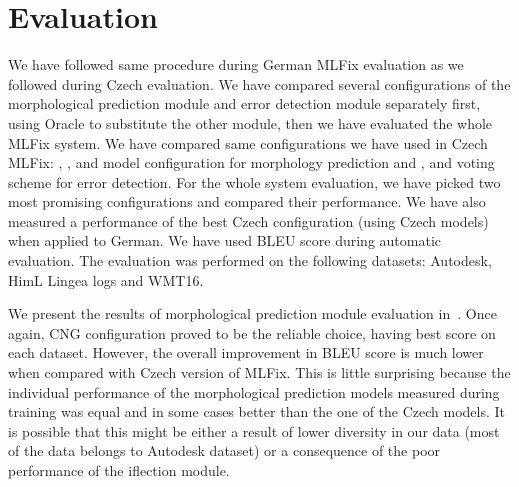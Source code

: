 \section{Evaluation}

We have followed same procedure during German MLFix evaluation as we followed during
Czech evaluation. We have compared several configurations of the morphological prediction
module and error detection module separately first, using Oracle to substitute the other
module, then we have evaluated the whole MLFix system. We have compared same configurations
we have used in Czech MLFix: , ,  and  model configuration for morphology
prediction and ,  and  voting scheme for error
detection. For the whole system evaluation, we have picked two most promising configurations
and compared their performance. We have also measured a performance of the best Czech configuration
(using Czech models) when applied to German. We have used BLEU score during automatic evaluation.
The evaluation was performed on the following datasets: Autodesk, HimL Lingea logs and WMT16.

We present the results of morphological prediction module evaluation in~.
Once again, CNG configuration proved to be the reliable choice, having best score on each dataset.
However, the overall improvement in BLEU score is much lower when compared with Czech version
of MLFix. This is little surprising because the individual performance of the morphological prediction
models measured during training was equal and in some cases better than the one of the Czech models.
It is possible that this might be either a result of lower diversity in our data (most of the data belongs
to Autodesk dataset) or a consequence of the poor performance of the iflection module.

